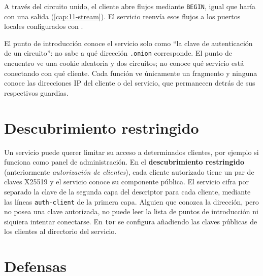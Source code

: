 A través del circuito unido, el cliente abre flujos mediante \texttt{BEGIN}, igual que haría con una salida (\cref{cap:11-stream}). El servicio reenvía esos flujos a los puertos locales configurados con .

\begin{approfondimento}
El punto de introducción conoce el servicio solo como \enquote{la clave de autenticación de un circuito}: no sabe a qué dirección \texttt{.onion} corresponde. El punto de encuentro ve una cookie aleatoria y dos circuitos; no conoce qué servicio está conectando con qué cliente. Cada función ve únicamente un fragmento y ninguna conoce las direcciones IP del cliente o del servicio, que permanecen detrás de sus respectivos guardias.
\end{approfondimento}

\section{Descubrimiento restringido}\label{sec:os-ristretta}

Un servicio puede querer limitar su acceso a determinados clientes, por ejemplo si funciona como panel de administración. En el \textbf{descubrimiento restringido} (anteriormente \emph{autorización de clientes}), cada cliente autorizado tiene un par de claves X25519 y el servicio conoce su componente pública. El servicio cifra por separado la clave de la segunda capa del descriptor para cada cliente, mediante las líneas \texttt{auth-client} de la primera capa. Alguien que conozca la dirección, pero no posea una clave autorizada, no puede leer la lista de puntos de introducción ni siquiera intentar conectarse. En \texttt{tor} se configura añadiendo las claves públicas de los clientes al directorio  del servicio.

\section{Defensas}\label{sec:os-difese}

